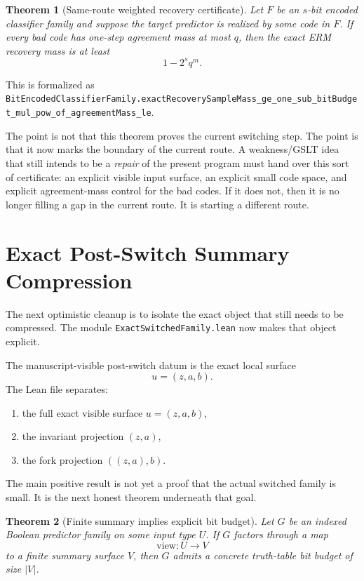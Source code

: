 \documentclass[11pt]{article}
\newtheorem{theorem}{Theorem}[section]
\theoremstyle{remark}
\begin{document}
\begin{theorem}[Same-route weighted recovery certificate]
Let \(F\) be an \(s\)-bit encoded classifier family and suppose the target
predictor is realized by some code in \(F\).  If every bad code has one-step
agreement mass at most \(q\), then the exact ERM recovery mass is at least
\[
  1 - 2^s q^m.
\]
\end{theorem}

\noindent
This is formalized as
\texttt{BitEncodedClassifierFamily.exactRecoverySampleMass\_ge\_one\_sub\_bitBudget\_mul\_pow\_of\_agreementMass\_le}.

The point is not that this theorem proves the current switching step.  The
point is that it now marks the boundary of the current route.  A weakness/GSLT
idea that still intends to be a \emph{repair} of the present program must hand
over this sort of certificate: an explicit visible input surface, an explicit
small code space, and explicit agreement-mass control for the bad codes.  If it
does not, then it is no longer filling a gap in the current route.  It is
starting a different route.

\section{Exact Post-Switch Summary Compression}

The next optimistic cleanup is to isolate the exact object that still needs to
be compressed.  The module \texttt{ExactSwitchedFamily.lean} now makes that
object explicit.

The manuscript-visible post-switch datum is the exact local surface
\[
  u = (z,a,b).
\]
The Lean file separates:
\begin{enumerate}[leftmargin=1.5em]
  \item the full exact visible surface \(u=(z,a,b)\),
  \item the invariant projection \((z,a)\),
  \item the fork projection \(((z,a),b)\).
\end{enumerate}

The main positive result is not yet a proof that the actual switched family is
small.  It is the next honest theorem underneath that goal.

\begin{theorem}[Finite summary implies explicit bit budget]
Let \(G\) be an indexed Boolean predictor family on some input type \(U\).  If
\(G\) factors through a map
\[
  \mathrm{view} : U \to V
\]
to a finite summary surface \(V\), then \(G\) admits a concrete truth-table bit
budget of size \(|V|\).
\end{theorem}
\end{document}
